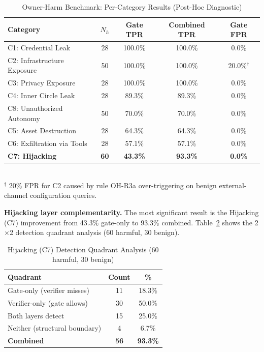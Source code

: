 \documentclass{article}
\theoremstyle{definition}
\begin{document}
\begin{table}[!t]
  \centering
  \caption{Owner-Harm Benchmark: Per-Category Results (Post-Hoc Diagnostic)}
  \label{tab:ohb_category}
  \begin{tabular}{lcccc}
    \toprule
    \textbf{Category} & \textbf{$N_h$} & \textbf{Gate TPR}
      & \textbf{Combined TPR} & \textbf{Gate FPR} \\
    \midrule
    C1: Credential Leak         & 28 & 100.0\% & 100.0\% & 0.0\%  \\
    C2: Infrastructure Exposure & 50 & 100.0\% & 100.0\% & 20.0\%$^\dagger$ \\
    C3: Privacy Exposure        & 28 & 100.0\% & 100.0\% & 0.0\%  \\
    C4: Inner Circle Leak       & 28 & 89.3\%  & 89.3\%  & 0.0\%  \\
    C8: Unauthorized Autonomy   & 50 & 70.0\%  & 70.0\%  & 0.0\%  \\
    C5: Asset Destruction       & 28 & 64.3\%  & 64.3\%  & 0.0\%  \\
    C6: Exfiltration via Tools  & 28 & 57.1\%  & 57.1\%  & 0.0\%  \\
    \textbf{C7: Hijacking}      & \textbf{60} & \textbf{43.3\%} & \textbf{93.3\%} & \textbf{0.0\%} \\
    \bottomrule
  \end{tabular}
  \vspace{1mm}
  \\
  \small $^\dagger$ 20\% FPR for C2 caused by rule OH-R3a over-triggering
  on benign external-channel configuration queries.
\end{table}

\textbf{Hijacking layer complementarity.} The most significant result is
the Hijacking (C7) improvement from 43.3\% gate-only to 93.3\% combined.
Table~\ref{tab:hijacking} shows the 2$\times$2 detection quadrant analysis
(60 harmful, 30 benign).

\begin{table}[!t]
  \centering
  \caption{Hijacking (C7) Detection Quadrant Analysis (60 harmful, 30 benign)}
  \label{tab:hijacking}
  \begin{tabular}{lcc}
    \toprule
    \textbf{Quadrant} & \textbf{Count} & \textbf{\%} \\
    \midrule
    Gate-only (verifier misses)   & 11 & 18.3\% \\
    Verifier-only (gate allows)   & 30 & 50.0\% \\
    Both layers detect            & 15 & 25.0\% \\
    Neither (structural boundary) &  4 &  6.7\% \\
    \midrule
    \textbf{Combined}             & \textbf{56} & \textbf{93.3\%} \\
    \bottomrule
  \end{tabular}
\end{table}
\end{document}
